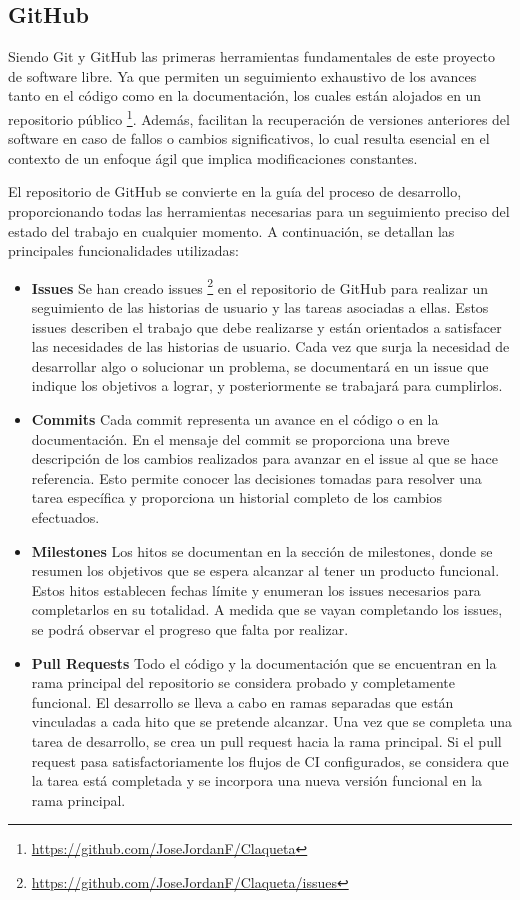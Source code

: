 \subsection{GitHub}

Siendo Git y GitHub las primeras herramientas fundamentales de este proyecto de software libre. Ya que permiten un seguimiento exhaustivo de los avances tanto en el código como en la documentación, los cuales están alojados en un repositorio público \footnote{\url{https://github.com/JoseJordanF/Claqueta}}. Además, facilitan la recuperación de versiones anteriores del software en caso de fallos o cambios significativos, lo cual resulta esencial en el contexto de un enfoque ágil que implica modificaciones constantes.

El repositorio de GitHub se convierte en la guía del proceso de desarrollo, proporcionando todas las herramientas necesarias para un seguimiento preciso del estado del trabajo en cualquier momento. A continuación, se detallan las principales funcionalidades utilizadas:

\begin{itemize}
\item \textbf{Issues} Se han creado issues \footnote{\url{https://github.com/JoseJordanF/Claqueta/issues}} en el repositorio de GitHub para realizar un seguimiento de las historias de usuario y las tareas asociadas a ellas. Estos issues describen el trabajo que debe realizarse y están orientados a satisfacer las necesidades de las historias de usuario. Cada vez que surja la necesidad de desarrollar algo o solucionar un problema, se documentará en un issue que indique los objetivos a lograr, y posteriormente se trabajará para cumplirlos.
\item \textbf{Commits} Cada commit representa un avance en el código o en la documentación. En el mensaje del commit se proporciona una breve descripción de los cambios realizados para avanzar en el issue al que se hace referencia. Esto permite conocer las decisiones tomadas para resolver una tarea específica y proporciona un historial completo de los cambios efectuados.
\item \textbf{Milestones} Los hitos se documentan en la sección de milestones, donde se resumen los objetivos que se espera alcanzar al tener un producto funcional. Estos hitos establecen fechas límite y enumeran los issues necesarios para completarlos en su totalidad. A medida que se vayan completando los issues, se podrá observar el progreso que falta por realizar.
\item \textbf{Pull Requests} Todo el código y la documentación que se encuentran en la rama principal del repositorio se considera probado y completamente funcional. El desarrollo se lleva a cabo en ramas separadas que están vinculadas a cada hito que se pretende alcanzar. Una vez que se completa una tarea de desarrollo, se crea un pull request hacia la rama principal. Si el pull request pasa satisfactoriamente los flujos de CI configurados, se considera que la tarea está completada y se incorpora una nueva versión funcional en la rama principal.
\end{itemize}

